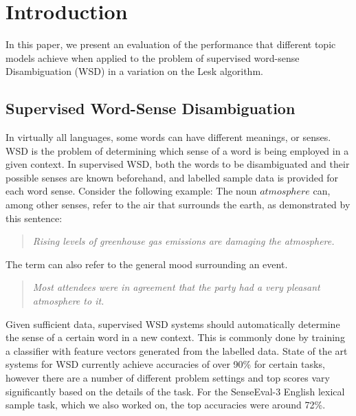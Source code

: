 \section{Introduction}
In this paper, we present an evaluation of the performance that different topic models achieve when applied to the problem of supervised word-sense Disambiguation (WSD) in a variation on the Lesk algorithm. 

\subsection{Supervised Word-Sense Disambiguation}
In virtually all languages, some words can have different meanings, or senses. WSD is the problem of determining  which sense of a word is being employed in a given context. In supervised WSD, both the words to be disambiguated and their possible senses are known beforehand, and labelled sample data is provided for each word sense. Consider the following example: The noun $atmosphere$ can, among other senses, refer to the air that surrounds the earth, as demonstrated by this sentence:\\
\begin{quotation}
\textit{Rising levels of greenhouse gas emissions are damaging the atmosphere.\\}
\end{quotation}
The term can also refer to the general mood surrounding an event. 
\begin{quotation}
\textit{Most attendees were in agreement that the party had a very pleasant atmosphere to it.\\}
\end{quotation}
Given sufficient data, supervised WSD systems should automatically determine the sense of a certain word in a new context. This is commonly done by training a classifier with feature vectors generated from the labelled data. State of the art systems for WSD currently achieve accuracies of over 90\% for certain tasks\cite{stateofart_scores}, however there are a number of different problem settings and top scores vary significantly based on the details of the task. For the SenseEval-3 English lexical sample task, which we also worked on, the top accuracies were around 72\%\cite{senseval3paper}.



